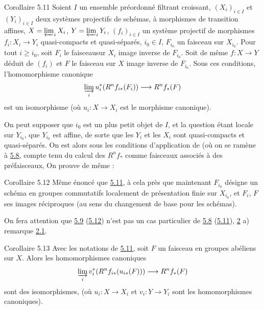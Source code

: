 \documentclass[10pt]{../fichiers-configuration-latex/smfart}
\begin{document}
\begin{enonce*}{Corollaire 5.11}
Soient $I$ un ensemble préordonné filtrant croissant, $(X_i)_{i \in
I}$ et $(Y_i)_{i \in I}$ deux systèmes projectifs de schémas, à
morphismes de transition affines, $X = \varprojlim_{i} X_i$, $Y =
\varprojlim_{i} Y_i$, $(f_i)_{i \in I}$ un système projectif de
morphismes $f_i : X_i \to Y_i$ quasi-compacts et quasi-séparés, $i_0
\in I$, $F_{i_0}$ un faisceau sur $X_{i_0}$. Pour tout $i \geq i_0$,
soit $F_i$ le faisceau\pageoriginale sur $X_i$ image inverse de
$F_{i_0}$. Soit de même $f : X \to Y$ déduit de $(f_i)$ et $F$ le
faisceau sur $X$ image inverse de $F_{i_0}$. Sous ces conditions,
l'homomorphisme canonique
$$
\varinjlim_{i} u^{\ast}_i (R^n f_{i\ast} (F_i)) \to R^n
f_{\ast} (F)
$$
est un isomorphisme (où $u_i : X \to X_i$ est le morphisme canonique).
\end{enonce*}

On peut supposer que $i_0$ est un plus petit objet de $I$, et la
question étant locale sur $Y_{i_0}$, que $Y_{i_0}$ est affine, de
sorte que les $Y_i$ et les $X_i$ sont quasi-compacts et
quasi-séparés. On est alors sous les conditions d'application de
 (où on se ramène à \hyperref[VII.cor5.8]{5.8}, compte
tenu du calcul des $R^{n} f_{\ast}$ comme faisceaux associés à des
préfaisceaux, On prouve de même :

\begin{enonce*}{Corollaire 5.12}
Même énoncé que \hyperref[VII.cor5.11]{5.11}, à cela près que maintenant $F_{i_0}$ désigne un
schéma en groupes commutatifs localement de présentation finie sur
$X_{i_0}$, et $F_i$, $F$ ses images réciproques (au sens du changement
de base pour les schémas).
\end{enonce*}

On fera attention que \hyperref[VII.cor5.9]{5.9} (\resp \hyperref[VII.cor5.12]{5.12}) n'est pas un cas particulier de
\hyperref[VII.cor5.8]{5.8} (\resp \hyperref[VII.cor5.11]{5.11}), \cf \hyperref[VII.sec2]{2} a) remarque \hyperref[VII.rem2.1]{2.1}.

\begin{enonce*}{Corollaire 5.13}
Avec les notations de \hyperref[VII.cor5.11]{5.11}, soit $F$ un faisceau en groupes abéliens
sur $X$. Alors les homomorphismes canoniques
$$
\varinjlim_i v_i^{\ast} (R^n f_{i\ast} (u_{i\ast} (F))) \to
R^n f_{\ast} (F)
$$
sont des isomorphismes, (où $u_i : X \to X_i$ et $v_i : Y \to Y_i$
sont les homomorphismes canoniques).
\end{enonce*}
\end{document}
